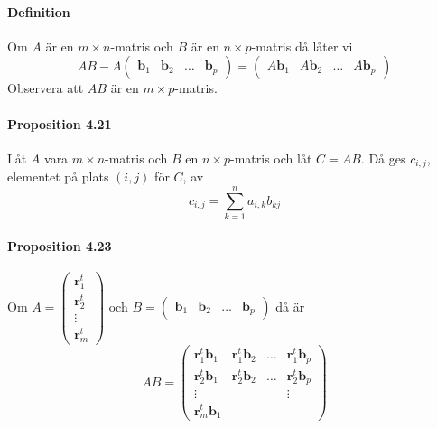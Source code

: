 \paragraph{Definition} Om $A$ är en $m\times n$-matris och $B$ är en $n\times p$-matris då låter vi 
\begin{equation*}
    AB-A\begin{pmatrix}
        \bm{b}_{1}& \bm{b}_{2} &\ldots&\bm{b}_{p}
    \end{pmatrix}=\begin{pmatrix}
        A\bm{b}_{1}& A\bm{b}_{2} & \ldots &A\bm{b}_{p}
    \end{pmatrix}
\end{equation*}
Observera att $AB$ är en $m\times p$-matris.

\paragraph{Proposition 4.21} Låt $A$ vara $m\times n$-matris och $B$ en $n\times p$-matris och låt $C=AB$.
Då ges $c_{i,j}$, elementet på plats $(i,j)$ för $C$, av 
\begin{equation*}
    c_{i,j}=\sum_{k=1}^{n}a_{i,k}b_{kj}
\end{equation*}

\paragraph{Proposition 4.23} Om $A=\begin{pmatrix}\bm{r}^{t}_{1}\\\bm{r}^{t}_{2}\\\vdots\\\bm{r}^{t}_{m}\end{pmatrix}$ och 
$B=\begin{pmatrix}\bm{b}_{1}&\bm{b}_{2}&\ldots&\bm{b}_{p}\end{pmatrix}$ då är 
\begin{equation*}
        AB=\begin{pmatrix}
        \bm{r}^{t}_{1}\bm{b}_{1} & \bm{r}^{t}_{1}\bm{b}_{2} & \ldots & \bm{r}^{t}_{1}\bm{b}_{p}\\
        \bm{r}^{t}_{2}\bm{b}_{1} & \bm{r}^{t}_{2}\bm{b}_{2} & \ldots & \bm{r}^{t}_{2}\bm{b}_{p}\\
        \vdots & & & \vdots\\
        \bm{r}^{t}_{m}\bm{b}_{1}
    \end{pmatrix}
\end{equation*}

